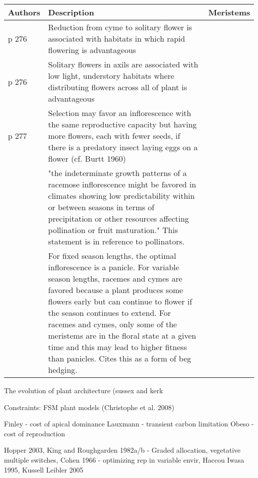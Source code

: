 \documentclass[12pt, oneside]{article}   	%
\begin{document}
   \begin{tabularx}{\textwidth}{|l| >{\setlength{\baselineskip}{.5\baselineskip}}X|l|}
\hline
Authors & Description & Meristems \\ \hline
  \cite{stebbins1974} p 276        & Reduction from cyme to solitary flower is associated with habitats in which rapid flowering is advantageous      &           \\ \hline
 \cite{stebbins1974} p 276        & Solitary flowers in axils are associated with low light, understory habitats where distributing flowers across all of plant is advantageous     &           \\ \hline
  \cite{stebbins1974} p 277        & Selection may favor an inflorescence with the same reproductive capacity but having more flowers, each with fewer seeds, if there is a predatory insect laying eggs on a flower (cf. Burtt 1960)    &           \\ \hline
   \cite{wyatt1982}       &  "the indeterminate growth patterns of a racemose inflorescence might be favored in climates showing low predictability within or between seasons in terms of precipitation or other resources affecting pollination or fruit maturation." This statement is in reference to pollinators.    &           \\ \hline
    \cite{Prusinkiewicz2007}       &  For fixed season lengths, the optimal inflorescence is a panicle. For variable season lengths, racemes and cymes are favored because a plant produces some flowers early but can continue to flower if the season continues to extend. For racemes and cymes, only some of the meristems are in the floral state at a given time and this may lead to higher fitness than panicles. Cites this as a form of beg hedging.  &           \\ \hline

 \end{tabularx}


The evolution of plant
architecture (sussex and kerk

Constraints: FSM plant models (Christophe et al. 2008)

Finley - cost of apical dominance
 Lauxmann - transient carbon limitation
 Obeso - cost of reproduction
 
 Hopper 2003, 
 King and Roughgarden 1982a/b - Graded allocation, vegetative multiple switches, Cohen 1966 - optimizing rep in variable envir, Haccou Iwasa 1995, Kussell Leibler 2005


\iffalse
\end{document}

